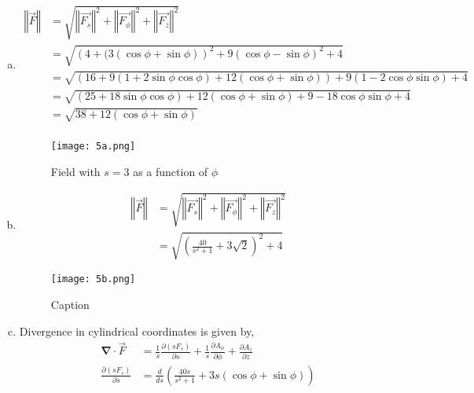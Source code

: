 \begin{problem}{}{}
    \begin{enumerate}[(a)]
        \item 
        \begin{align*}
            \left\Vert \vec{F} \right\Vert &= \sqrt{\left\Vert \vec{F_s} \right\Vert^2+\left\Vert \vec{F_{\phi}} \right\Vert^2 + \left\Vert \vec{F_z} \right\Vert^2}\\
            &= \sqrt{\left(4+(3\left(\cos\phi + \sin\phi\right)\right)^2 + 9\left(\cos\phi - \sin\phi\right)^2 + 4}\\
            &= \sqrt{\left(16+9\left(1+2\sin\phi\cos\phi\right) + 12\left(\cos\phi+\sin\phi\right)\right) + 9\left(1 - 2\cos\phi\sin\phi\right) + 4}\\
            &= \sqrt{\left(25 + 18\sin\phi\cos\phi\right) + 12\left(\cos\phi+\sin\phi\right) + 9 - 18\cos\phi\sin\phi + 4}\\
            &= \sqrt{38 + 12\left(\cos\phi+\sin\phi\right)}\\
        \end{align*}
        \begin{figure}
            \centering
            \texttt{[image: 5a.png]}
            \caption{Field with $s=3$ as a function of $\phi$}
            \label{fig:enter-label}
        \end{figure}
    \item 
    \begin{align*}
        \left\Vert \vec{F} \right\Vert &= \sqrt{\left\Vert \vec{F_s} \right\Vert^2+\left\Vert \vec{F_{\phi}} \right\Vert^2 + \left\Vert \vec{F_z} \right\Vert^2}\\
        &= \sqrt{\left(\frac{40}{s^2+1} + 3\sqrt{2}\right)^2 + 4}
    \end{align*}
    \begin{figure}
            \centering
            \texttt{[image: 5b.png]}
            \caption{Caption}
            \label{fig:enter-label}
        \end{figure}
    \item Divergence in cylindrical coordinates is given by,
    \begin{align*}
        \mathbf{\nabla}\cdot \vec{F} &= \frac{1}{s}\frac{\partial \left(s F_s\right)}{\partial s} + \frac{1}{s}\frac{\partial A_{\phi}}{\partial \phi} + \frac{\partial A_z}{\partial z}\\
        \frac{\partial \left(sF_s\right)}{\partial s} &= \frac{d}{ds}\left(\frac{40s}{s^2+1} + 3s\left(\cos\phi+\sin\phi\right)\right)\\

\end{align*}
\end{enumerate}
\end{problem}
